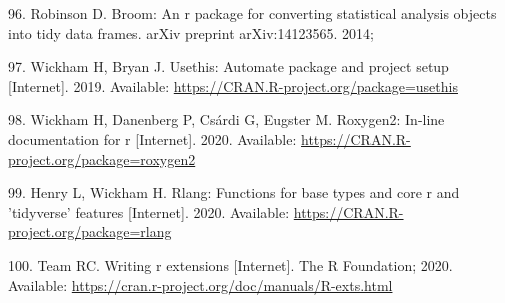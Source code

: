 \documentclass[10pt,letterpaper]{article}
\begin{document}
\leavevmode\hypertarget{ref-robinson2014}{}%
96. Robinson D. Broom: An r package for converting statistical analysis
objects into tidy data frames. arXiv preprint arXiv:14123565. 2014;

\leavevmode\hypertarget{ref-usethis}{}%
97. Wickham H, Bryan J. Usethis: Automate package and project setup
{[}Internet{]}. 2019. Available:
\url{https://CRAN.R-project.org/package=usethis}

\leavevmode\hypertarget{ref-roxygen2}{}%
98. Wickham H, Danenberg P, Csárdi G, Eugster M. Roxygen2: In-line
documentation for r {[}Internet{]}. 2020. Available:
\url{https://CRAN.R-project.org/package=roxygen2}

\leavevmode\hypertarget{ref-rlang}{}%
99. Henry L, Wickham H. Rlang: Functions for base types and core r and
'tidyverse' features {[}Internet{]}. 2020. Available:
\url{https://CRAN.R-project.org/package=rlang}

\leavevmode\hypertarget{ref-Rcore2020}{}%
100. Team RC. Writing r extensions {[}Internet{]}. The R Foundation;
2020. Available:
\url{https://cran.r-project.org/doc/manuals/R-exts.html}

\nolinenumbers
\end{document}
